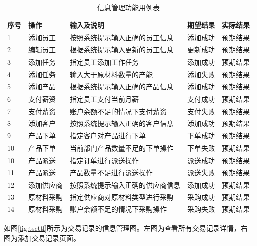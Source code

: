 \begin{table}[H]
    \centering
    \caption{信息管理功能用例表}
    \label{tab:ifmtmngmt}
    \begin{tabularx}{.95\textwidth}{p{2em}<{\centering}X<{\centering}p{16em}<{\centering}X<{\centering}X<{\centering}}
        \toprule
        序号 & 操作 & 输入及说明 & 期望结果 & 实际结果 \\
        \midrule
        1 & 添加员工 & 按照系统提示输入正确的员工信息 & 添加成功 & 预期结果 \\
        2 & 编辑员工 & 根据系统提示输入更新的员工信息 & 更新成功 & 预期结果 \\
        3 & 添加任务 & 指定员工添加工作任务 & 添加成功 & 预期结果 \\
        4 & 添加任务 & 输入大于原材料数量的产能 & 添加失败 & 预期结果 \\
        5 & 添加产品 & 根据系统提示输入正确的产品信息 & 添加成功 & 预期结果 \\
        6 & 支付薪资 & 指定员工支付当前月薪 & 支付成功 & 预期结果 \\
        7 & 支付薪资 & 账户余额不足的情况下支付薪资 & 支付失败 & 预期结果 \\
        8 & 添加客户 & 按照系统提示输入正确的客户信息 & 添加成功 & 预期结果 \\
        9 & 产品下单 & 指定客户对产品进行下单 & 下单成功 & 预期结果 \\
        10 & 产品下单 & 当前部门产品数量不足的下单操作 & 下单失败 & 预期结果 \\
        10 & 产品派送 & 指定订单进行派送操作 & 派送成功 & 预期结果 \\
        11 & 产品派送 & 产品数量不足进行派送操作 & 派送失败 & 预期结果 \\
        12 & 添加供应商 & 按照系统提示输入正确的供应商信息 & 添加成功 & 预期结果 \\
        13 & 原材料采购 & 指定供应商对原材料类型进行采购 & 采购成功 & 预期结果 \\
        14 & 原材料采购 & 账户余额不足的情况下采购操作 & 采购失败 & 预期结果 \\
        \bottomrule
    \end{tabularx}
\end{table}

如图\ref{fig:tscttf}所示为交易记录的信息管理图。左图为查看所有交易记录详情，右图为添加交易记录页面。

